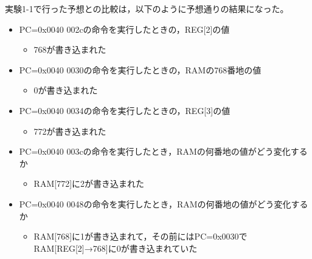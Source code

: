 実験1-1で行った予想との比較は，以下のように予想通りの結果になった。
\begin{itemize}
  \item PC=0x0040 002cの命令を実行したときの，REG[2]の値
  \begin{itemize}
    \item 768が書き込まれた
  \end{itemize}
  \item PC=0x0040 0030の命令を実行したときの，RAMの768番地の値
  \begin{itemize}
    \item 0が書き込まれた
  \end{itemize}
  \item PC=0x0040 0034の命令を実行したときの，REG[3]の値
  \begin{itemize}
    \item 772が書き込まれた
  \end{itemize}
  \item PC=0x0040 003cの命令を実行したとき，RAMの何番地の値がどう変化するか
  \begin{itemize}
    \item RAM[772]に2が書き込まれた
  \end{itemize}
  \item PC=0x0040 0048の命令を実行したとき，RAMの何番地の値がどう変化するか
  \begin{itemize}
    \item RAM[768]に1が書き込まれて，その前にはPC=0x0030でRAM[REG[2]→768]に0が書き込まれていた
  \end{itemize}
\end{itemize}

